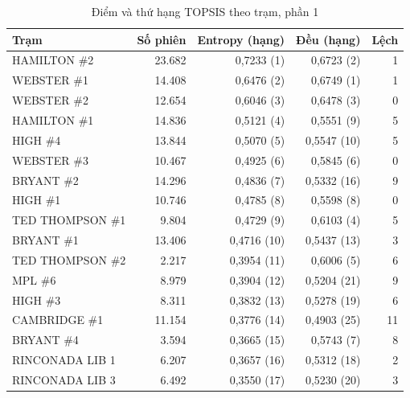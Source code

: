 \documentclass[conference,a4paper]{IEEEtran}
\begin{document}
\begin{table}[!t]
\caption{Điểm và thứ hạng TOPSIS theo trạm, phần 1}
\label{tab:all_stations_0}
\centering\footnotesize
\setlength{\tabcolsep}{3pt}
\begin{tabularx}{\textwidth}{@{}Xrrrr@{}}
\toprule
\textbf{Trạm} & \textbf{Số phiên} & \textbf{Entropy (hạng)} & \textbf{Đều (hạng)} & \textbf{Lệch} \\
\midrule
HAMILTON \#2 & 23.682 & 0,7233 (1) & 0,6723 (2) & 1 \\
WEBSTER \#1 & 14.408 & 0,6476 (2) & 0,6749 (1) & 1 \\
WEBSTER \#2 & 12.654 & 0,6046 (3) & 0,6478 (3) & 0 \\
HAMILTON \#1 & 14.836 & 0,5121 (4) & 0,5551 (9) & 5 \\
HIGH \#4 & 13.844 & 0,5070 (5) & 0,5547 (10) & 5 \\
WEBSTER \#3 & 10.467 & 0,4925 (6) & 0,5845 (6) & 0 \\
BRYANT \#2 & 14.296 & 0,4836 (7) & 0,5332 (16) & 9 \\
HIGH \#1 & 10.746 & 0,4785 (8) & 0,5598 (8) & 0 \\
TED THOMPSON \#1 & 9.804 & 0,4729 (9) & 0,6103 (4) & 5 \\
BRYANT \#1 & 13.406 & 0,4716 (10) & 0,5437 (13) & 3 \\
TED THOMPSON \#2 & 2.217 & 0,3954 (11) & 0,6006 (5) & 6 \\
MPL \#6 & 8.979 & 0,3904 (12) & 0,5204 (21) & 9 \\
HIGH \#3 & 8.311 & 0,3832 (13) & 0,5278 (19) & 6 \\
CAMBRIDGE \#1 & 11.154 & 0,3776 (14) & 0,4903 (25) & 11 \\
BRYANT \#4 & 3.594 & 0,3665 (15) & 0,5743 (7) & 8 \\
RINCONADA LIB 1 & 6.207 & 0,3657 (16) & 0,5312 (18) & 2 \\
RINCONADA LIB 3 & 6.492 & 0,3550 (17) & 0,5230 (20) & 3 \\
\bottomrule
\end{tabularx}
\end{table}
\end{document}
